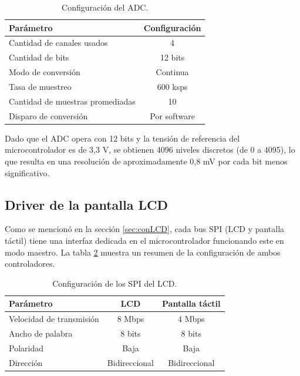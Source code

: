\begin{table}[H]
	\centering
	\caption{Configuración del ADC.}
	\begin{tabular}{l c}
		\toprule
		\textbf{Parámetro} & \textbf{Configuración}  \\
		\midrule
		Cantidad de canales usados & 4		\\
		Cantidad de bits		& 12 bits 	 		 \\
		Modo de conversión		& Continua   \\
		Tasa de muestreo		& 600 ksps	 \\
		Cantidad de muestras promediadas	& 10 \\
		Disparo de conversión	& Por software \\
		\bottomrule
		\hline
	\end{tabular}
	\label{tab:configADC}
\end{table}

Dado que el ADC opera con 12 bits y la tensión de referencia del microcontrolador es de 3,3 V, se obtienen 4096 niveles discretos (de 0 a 4095), lo que resulta en una resolución de aproximadamente 0,8 mV por cada bit menos significativo.

\subsection{Driver de la pantalla LCD}

Como se mencionó en la sección \ref{sec:conLCD}, cada bus SPI (LCD y pantalla táctil) tiene una interfaz dedicada en el microcontrolador funcionando este en modo maestro. La tabla \ref{tab:configSPI} muestra un resumen de la configuración de ambos controladores.

\begin{table}[H]
	\centering
	\caption{Configuración de los SPI del LCD.}
	\begin{tabular}{l c c}
		\toprule
		\textbf{Parámetro} & \textbf{LCD} & \textbf{Pantalla táctil} \\
		\midrule
		Velocidad de transmisión	& 8 Mbps & 4 Mbps	\\
		Ancho de palabra 				& 8 bits & 8 bits	    \\
		Polaridad							& Baja & Baja \\
		Dirección							& Bidireccional & Bidireccional \\
		\bottomrule
		\hline
	\end{tabular}
	\label{tab:configSPI}
\end{table}

